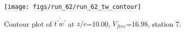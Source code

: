 \begin{figure}[H]
\centering
\texttt{[image: figs/run\_62/run\_62\_tw\_contour]}
\caption{Contour plot of $\overline{t^\prime w^\prime}$ at $z/c$=10.00, $V_{free}$=16.98, station 7.}
\end{figure}


